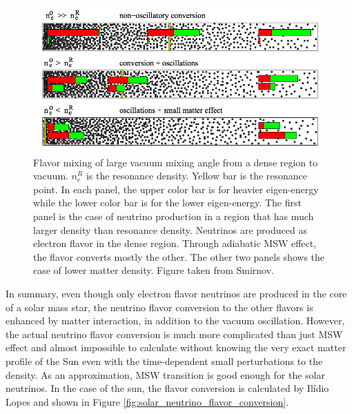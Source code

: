 \documentclass[%
 aip,
 jmp,%
 amsmath,amssymb,
 reprint,%
]{revtex4-1}
\begin{document}
\begin{figure}
\centering
\includegraphics[width=\columnwidth]{assets/msw_and_density.png}
\caption{Flavor mixing of large vacuum mixing angle from a dense region to vacuum. $n_e^R$ is the resonance density. Yellow bar is the resonance point. In each panel, the upper color bar is for heavier eigen-energy while the lower color bar is for the lower eigen-energy. The first panel is the case of neutrino production in a region that has much larger density than resonance density. Neutrinos are produced as electron flavor in the dense region. Through adiabatic MSW effect, the flavor converts mostly the other. The other two panels shows the case of lower matter density. Figure taken from Smirnov.\cite{Smirnov2003}}
\label{fig:msw_and_density}
\end{figure}



In summary, even though only electron flavor neutrinos are produced in the core of a solar mass star, the neutrino flavor conversion to the other flavors is enhanced by matter interaction, in addition to the vacuum oscillation. However, the actual neutrino flavor conversion is much more complicated than just MSW effect and almost impossible to calculate without knowing the very exact matter profile of the Sun even with the time-dependent small perturbations to the density. As an approximation, MSW transition is good enough for the solar neutrinos.\cite{Lopes2013a} In the case of the sun, the flavor conversion is calculated by Ilídio Lopes and shown in Figure \ref{fig:solar_neutrino_flavor_conversion}.\cite{Lopes2013}
\end{document}
